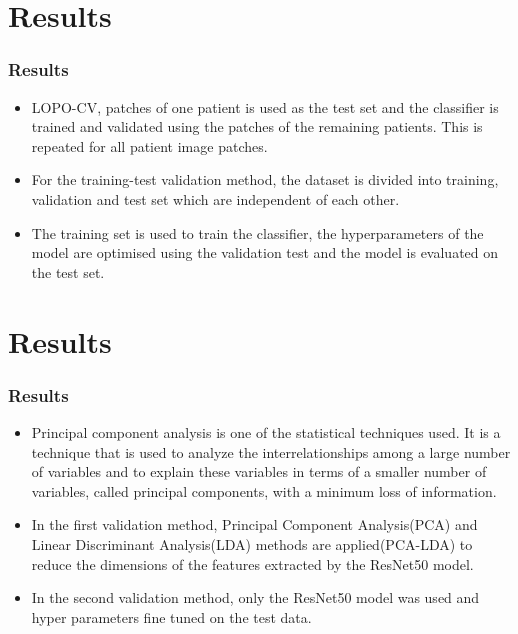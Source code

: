 \documentclass{beamer}
\begin{document}
\section{Results}

\begin{frame}
\frametitle{Results}
\begin{itemize}
   \item LOPO-CV, patches of one patient is used as the test set and the classifier is trained and validated using the patches of the remaining patients. This is repeated for all patient image patches.
   \item For the training-test validation method, the dataset is divided into training, validation and test set which are independent of each other.
   \item The training set is used to train the classifier, the hyperparameters of the model are optimised using the validation test and the model is evaluated on the test set.
\end{itemize}
\end{frame}

\section{Results}

\begin{frame}
\frametitle{Results}
\begin{itemize}
   \item Principal component analysis is one of the statistical techniques used. It is a technique that is used to analyze the interrelationships among a large number of variables and to explain these variables in terms of a smaller number of variables, called principal components, with a minimum loss of information.
   \item In the first validation method, Principal Component Analysis(PCA) and Linear Discriminant Analysis(LDA) methods are applied(PCA-LDA) to reduce the dimensions of the features extracted by the ResNet50 model.
   \item In the second validation method, only the ResNet50 model was used and hyper parameters fine tuned on the test data.
\end{itemize}
\end{frame}

\end{document}
